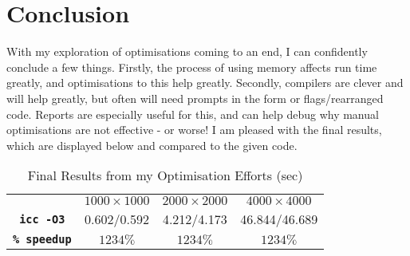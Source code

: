 \documentclass[10pt,twocolumn,a4paper]{article}
\begin{document}
\section{Conclusion}
With my exploration of optimisations coming to an end, I can confidently conclude a few things. Firstly, the process of using memory affects run time greatly, and optimisations to this help greatly. Secondly, compilers are clever and will help greatly, but often will need prompts in the form or flags/rearranged code. Reports are especially useful for this, and can help debug why manual optimisations are not effective - or worse! I am pleased with the final results, which are displayed below and compared to the given code.

\vspace{-0.2cm}
\begin{table}[h]
\small
\centering
\begin{tabular}{c|c|c|c}
    & \textbf{$1000\times1000$} & \textbf{$2000\times2000$} & \textbf{$4000\times4000$}   \\
\textbf{\texttt{icc -O3}} & 0.602/0.592 & 4.212/4.173 & 46.844/46.689 \\
\textbf{\texttt{\% speedup}} & $1234\%$ & $1234\%$ & $1234\%$ \\
\end{tabular}
\caption{Final Results from my Optimisation Efforts (sec)}
\label{finalResults}
\end{table}\par

\vspace{-0.3cm}
\printbibliography[title={Bibliography}]
\end{document}
